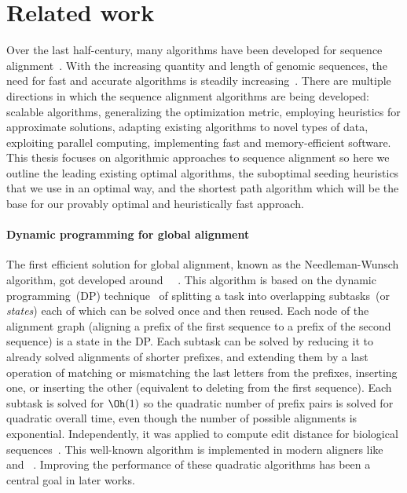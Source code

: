 \section*{Related work}

Over the last half-century, many algorithms have been developed for sequence
alignment~\citep{navarro2001guided}. With the increasing quantity and length of
genomic sequences, the need for fast and accurate algorithms is steadily
increasing~\cite{alser2021technology}. There are multiple directions in which
the sequence alignment algorithms are being developed: scalable algorithms,
generalizing the optimization metric, employing heuristics for approximate
solutions, adapting existing algorithms to novel types of data, exploiting
parallel computing, implementing fast and memory-efficient software. This thesis
focuses on algorithmic approaches to sequence alignment so here we outline the
leading existing optimal algorithms, the suboptimal seeding heuristics that we
use in an optimal way, and the \A shortest path algorithm which will be the base
for our provably optimal and heuristically fast approach.

\paragraph{Dynamic programming for global alignment}
The first efficient solution for global alignment, known as the Needleman-Wunsch
algorithm, got developed around~\citeyear{vintsyuk1968speech}~
\cite{vintsyuk1968speech,needleman1970general}. This algorithm is based on the
dynamic programming~(DP) technique~\cite{bellman1954theory} of splitting a task
into overlapping subtasks~(or \emph{states}) each of which can be solved once
and then reused. Each node of the alignment graph (aligning a prefix of the
first sequence to a prefix of the second sequence) is a state in the DP. Each
subtask can be solved by reducing it to already solved alignments of shorter
prefixes, and extending them by a last operation of matching or mismatching the
last letters from the prefixes, inserting one, or inserting the other
(equivalent to deleting from the first sequence). Each subtask is solved for
$\Oh(1)$ so the quadratic number of prefix pairs is solved for quadratic overall
time, even though the number of possible alignments is exponential.
Independently, it was applied to compute edit distance for biological
sequences~\citep{needleman1970general,sankoff1972matching,sellers1974theory,wagner1974string}.
This well-known algorithm is implemented in modern aligners like
\seqan~\citep{reinert2017seqan} and \parasail~\citep{daily2016parasail}.
Improving the performance of these quadratic algorithms has been a central goal
in later works.

